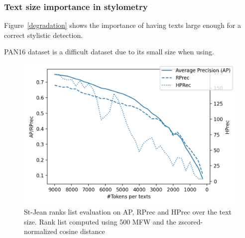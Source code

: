 \subsubsection{Text size importance in stylometry}

Figure~\ref{degradation} shows the importance of having texts large enough for a correct stylistic detection.

PAN16 dataset is a difficult dataset due to its small size when using.

\begin{figure}
  \includegraphics[width=\linewidth]{img/degradation.png}
  \caption{St-Jean ranks list evaluation on AP, RPrec and HPrec over the text size. Rank list computed using 500 MFW and the zscored-normalized cosine distance}
  \label{img:degradation}
\end{figure}
